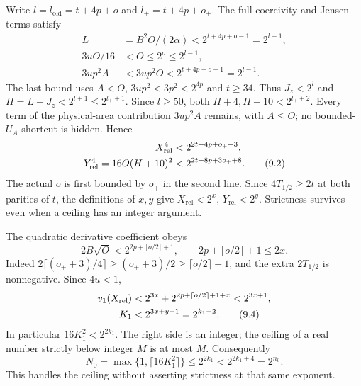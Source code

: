 Write $l=l_{\mathrm{old}}=t+4p+o$ and $l_+=t+4p+o_+$.
The full coercivity and Jensen terms satisfy
\begin{align*}
 L&=B^2O/(2\alpha)<2^{t+4p+o-1}=2^{l-1},\\
 3uO/16&<O\le2^o\le2^{l-1},\\
 3up^2A&<3up^2O<2^{t+4p+o-1}=2^{l-1}.
\end{align*}
The last bound uses $A<O$, $3up^2<3p^2<2^{4p}$ and $t\ge34$.
Thus $J_z<2^l$ and $H=L+J_z<2^{l+1}\le2^{l_++1}$.
Since $l\ge50$, both $H+4,H+10<2^{l_++2}$.
Every term of the physical-area contribution $3up^2A$ remains, with
$A\le O$; no bounded-$U_A$ shortcut is hidden. Hence
\begin{align}
 X_{\mathrm{rel}}^4&<2^{2t+4p+o_++3},\notag\\
 Y_{\mathrm{rel}}^4=16O(H+10)^2&<2^{2t+8p+3o_++8}.\tag{9.2}
\end{align}
The actual $o$ is first bounded by $o_+$ in the second line.
Since $4T_{1/2}\ge2t$ at both parities of $t$, the definitions of $x,y$
give $X_{\mathrm{rel}}<2^x$, $Y_{\mathrm{rel}}<2^y$.
Strictness survives even when a ceiling has an integer argument.

The quadratic derivative coefficient obeys
\begin{equation}
 2B\sqrt O<2^{2p+\lceil o/2\rceil+1},\qquad
 2p+\lceil o/2\rceil+1\le2x.\tag{9.3}
\end{equation}
Indeed $2\lceil(o_++3)/4\rceil\ge(o_++3)/2\ge\lceil o/2\rceil+1$,
and the extra $2T_{1/2}$ is nonnegative. Since $4u<1$,
\begin{align}
 v_1(X_{\mathrm{rel}})&<2^{3x}+2^{2p+\lceil o/2\rceil+1+x}
                         <2^{3x+1},\notag\\
 K_1&<2^{3x+y+1}=2^{k_1-2}.\tag{9.4}
\end{align}
In particular $16K_1^2<2^{2k_1}$. The right side is an integer;
the ceiling of a real number strictly below integer $M$ is at most $M$.
Consequently
\begin{equation}
 N_0=\max\{1,\lceil16K_1^2\rceil\}\le2^{2k_1}
       <2^{2k_1+4}=2^{n_0}.\tag{9.5}
\end{equation}
This handles the ceiling without asserting strictness at that same exponent.

